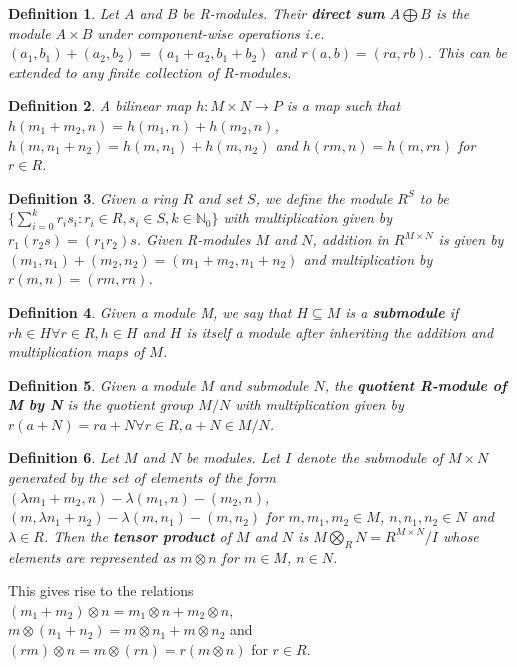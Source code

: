\documentclass{report}
\newtheorem{definition}{Definition}
\begin{document}
\begin{definition}
Let $A$ and $B$ be R-modules. Their \textbf{direct sum} $A\bigoplus B$ is the module $A\times B$ under component-wise operations i.e. $(a_1,b_1)+(a_2,b_2)=(a_1+a_2,b_1+b_2)$ and $r(a,b)=(ra,rb)$. This can be extended to any finite collection of R-modules.
\end{definition}

\begin{definition}
A bilinear map $h\colon M\times N\to P$ is a map such that $h(m_1+m_2,n)=h(m_1,n)+h(m_2,n)$, $h(m,n_1+n_2)=h(m,n_1)+h(m,n_2)$ and $h(rm,n)=h(m,rn)$ for $r\in R$.
\end{definition}

\begin{definition}
Given a ring $R$ and set $S$, we define the module $R^S$ to be $\{\sum_{i=0}^kr_is_i:r_i\in R,s_i\in S,k\in\mathbb{N}_0\}$ with multiplication given by $r_1(r_2s)=(r_1r_2)s$. Given R-modules $M$ and $N$, addition in $R^{M\times N}$ is given by $(m_1,n_1)+(m_2,n_2)=(m_1+m_2,n_1+n_2)$ and multiplication by $r(m,n)=(rm,rn)$.
\end{definition}


\begin{definition}
Given a module M, we say that $H\subseteq M$ is a \textbf{submodule} if $rh\in H\forall r\in R,h\in H$ and $H$ is itself a module after inheriting the addition and multiplication maps of $M$.
\end{definition}

\begin{definition}
Given a module $M$ and submodule $N$, the \textbf{quotient R-module of M by N} is the quotient group $M/N$ with multiplication given by $r(a+N)=ra+N\forall r\in R,a+N\in M/N$.
\end{definition}

\begin{definition}
Let $M$ and $N$ be modules. Let $I$ denote the submodule of $M\times N$ generated by the set of elements of the form $(\lambda m_1+m_2,n)-\lambda(m_1,n)-(m_2,n)$, $(m,\lambda n_1+n_2)-\lambda(m,n_1)-(m,n_2)$ for $m,m_1,m_2\in M$, $n,n_1,n_2\in N$ and $\lambda\in R$. Then the \textbf{tensor product} of $M$ and $N$ is $M\bigotimes_R N=R^{M\times N}/I$ whose elements are represented as $m\otimes n$ for $m\in M$, $n\in N$.
\end{definition}

\noindent This gives rise to the relations\\ $(m_1+m_2)\otimes n=m_1\otimes n+m_2\otimes n$,\\
$m\otimes(n_1+n_2)=m\otimes n_1+m\otimes n_2$ and\\
$(rm)\otimes n=m\otimes (rn)=r(m\otimes n)$ for $r\in R$.
\end{document}
